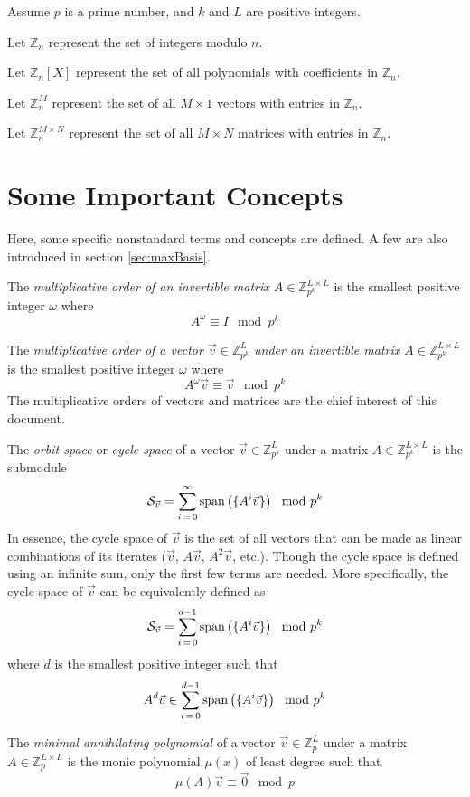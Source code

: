 \documentclass[a4paper, 12pt, reqno]{amsart}
\newcommand\vecspan[1]{\textup{span}\left( #1 \right)}
\begin{document}
	Assume $p$ is a prime number, and $k$ and $L$ are positive integers.
	
	Let $\mathds{Z}_n$ represent the set of integers modulo $n$.
	
	Let $\mathds{Z}_n[X]$ represent the set of all polynomials with coefficients in $\mathds{Z}_n$.
	
	Let $\mathds{Z}_n^M$ represent the set of all $M \times 1$ vectors with entries in $\mathds{Z}_n$.
	
	Let $\mathds{Z}_n^{M \times N}$ represent the set of all $M \times N$ matrices with entries in $\mathds{Z}_n$.
	
	\section{Some Important Concepts}
		Here, some specific nonstandard terms and concepts are defined. A few are also introduced in section \ref{sec:maxBasis}.
		
		The \emph{multiplicative order of an invertible matrix $A \in \mathds{Z}_{p^k}^{L \times L}$} is the smallest positive integer $\omega$ where
		\[
			A^\omega \equiv I \mod{p^k}
		\]
		
		The \emph{multiplicative order of a vector $\vec{v} \in \mathds{Z}_{p^k}^L$ under an invertible matrix $A \in \mathds{Z}_{p^k}^{L \times L}$} is the smallest 
		positive integer $\omega$ where
		\[
			A^\omega\vec{v} \equiv \vec{v} \mod{p^k}
		\]
		The multiplicative orders of vectors and matrices are the chief interest of this document.
		
		The \emph{orbit space} or \emph{cycle space} of a vector $\vec{v} \in \mathds{Z}_{p^k}^L$ under a matrix $A \in \mathds{Z}_{p^k}^{L \times L}$ is the submodule
		\[
			\mathcal{S}_{\vec{v}} = \sum_{i\,=\,0}^\infty \vecspan{\{A^i\vec{v}\}} \mod{p^k}
		\]
		In essence, the cycle space of $\vec{v}$ is the set of all vectors that can be made as linear combinations of its iterates 
		($\vec{v}$, $A\vec{v}$, $A^2\vec{v}$, etc.). Though the cycle space is defined using an infinite sum, only the first few terms are needed. More specifically, the 
		cycle space of $\vec{v}$ can be equivalently defined as
		\[
			\mathcal{S}_{\vec{v}} = \sum_{i\,=\,0}^{d-1} \vecspan{\{A^i\vec{v}\}} \mod{p^k}
		\]
		where $d$ is the smallest positive integer such that
		\[
			A^d\vec{v} \in \sum_{i\,=\,0}^{d-1} \vecspan{\{A^i\vec{v}\}} \mod{p^k}
		\]
		
		The \emph{minimal annihilating polynomial} of a vector $\vec{v} \in \mathds{Z}_p^L$ under a matrix $A \in \mathds{Z}_p^{L \times L}$ is the monic polynomial 
		$\mu(x)$ of least degree such that
		\[
			\mu(A)\vec{v} \equiv \vec{0} \mod{p}
		\]
		
\end{document}
